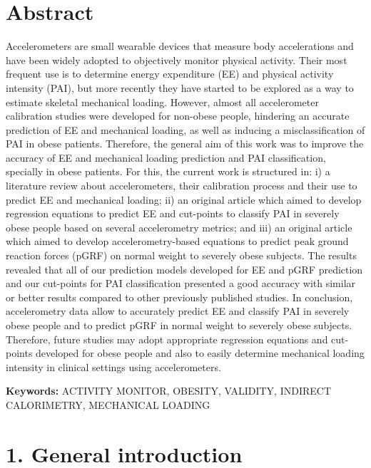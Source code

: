 \documentclass[12pt]{article}
\def\blankpage{%
      \clearpage%
      \thispagestyle{empty}%
      \addtocounter{page}{+0}%
      \null%
      \clearpage}
\begin{document}
\blankpage

\section*{\hfil Abstract \hfil}
\vspace{0.5em}

\noindent Accelerometers are small wearable devices that measure body accelerations and have been widely adopted to objectively monitor physical activity. Their most frequent use is to determine energy expenditure (EE) and physical activity intensity (PAI), but more recently they have started to be explored as a way to estimate skeletal mechanical loading. However, almost all accelerometer calibration studies were developed for non-obese people, hindering an accurate prediction of EE and mechanical loading, as well as inducing a misclassification of PAI in obese patients. Therefore, the general aim of this work was to improve the accuracy of EE and mechanical loading prediction and PAI classification, specially in obese patients. For this, the current work is structured in: i) a literature review about accelerometers, their calibration process and their use to predict EE and mechanical loading; ii) an original article which aimed to develop regression equations to predict EE and cut-points to classify PAI in severely obese people based on several accelerometry metrics; and iii) an original article which aimed to develop accelerometry-based equations to predict peak ground reaction forces (pGRF) on normal weight to severely obese subjects. The results revealed that all of our prediction models developed for EE and pGRF prediction and our cut-points for PAI classification presented a good accuracy with similar or better results compared to other previously published studies. In conclusion, accelerometry data allow to accurately predict EE and classify PAI in severely obese people and to predict pGRF in normal weight to severely obese subjects. Therefore, future studies may adopt appropriate regression equations and cut-points developed for obese people and also to easily determine mechanical loading intensity in clinical settings using accelerometers.

\vspace{\fill}
\noindent
\textbf{Keywords:} ACTIVITY MONITOR, OBESITY, VALIDITY, INDIRECT CALORIMETRY, MECHANICAL LOADING
\blankpage


\section*{\vfill\raggedleft\bfseries 1. General introduction}
\thispagestyle{empty} 
\blankpage
\end{document}
